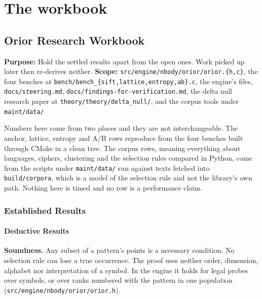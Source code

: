 \chapter{The workbook}

\section{Orior Research Workbook}

\textbf{Purpose:} Hold the settled results apart from the open ones. Work picked up later then re-derives neither. \textbf{Scope:} \texttt{src/\allowbreak{}engine/\allowbreak{}nbody/\allowbreak{}orior/\allowbreak{}orior.\{h,c\}}, the four benches at \texttt{bench/\allowbreak{}bench\_\{sift,lattice,entropy,ab\}.c}, the engine's files, \texttt{docs/\allowbreak{}steering.md}, \texttt{docs/\allowbreak{}findings-\allowbreak{}for-\allowbreak{}verification.md}, the delta null research paper at \texttt{theory/\allowbreak{}theory/\allowbreak{}delta\_null/}, and the corpus tools under \texttt{maint/\allowbreak{}data/\allowbreak{}}

Numbers here come from two places and they are not interchangeable. The anchor, lattice, entropy and A/B rows reproduce from the four benches built through CMake in a clean tree. The corpus rows, meaning everything about languages, ciphers, clustering and the selection rules compared in Python, come from the scripts under \texttt{maint/\allowbreak{}data/\allowbreak{}} run against texts fetched into \texttt{build/\allowbreak{}corpora}, which is a model of the selection rule and not the library's own path. Nothing here is timed and no row is a performance claim.

\subsection{Established Results}

\subsubsection{Deductive Results}

\textbf{Soundness.} Any subset of a pattern's points is a necessary condition. No selection rule can lose a true occurrence. The proof uses neither order, dimension, alphabet nor interpretation of a symbol. In the engine it holds for legal probes over symbols, or over ranks numbered with the pattern in one population (\texttt{src/\allowbreak{}engine/\allowbreak{}nbody/\allowbreak{}orior/\allowbreak{}orior.h}).


